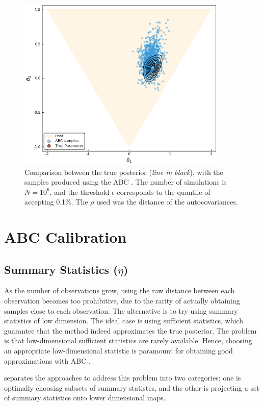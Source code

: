 \documentclass[runningheads]{llncs}
\begin{document}
  \begin{figure}[H]
      \centering
      \includegraphics[width=10cm]{images/ABCmodel1.png}
      \caption{Comparison between the true posterior
      (\textit{line in black}), with the samples produced using the ABC
      . The number of simulations is $N = 10^6$,
      and the threshold $\epsilon$ corresponds to the quantile of
      accepting 0.1\%. The $\rho$ used was the distance
      of the autocovariances.}
  \end{figure}

\section{ABC Calibration}
\subsection{Summary Statistics ($\eta$)}
\label{subsec:statistical-summaries}

As the number of observations
grow, using the raw distance between each observation becomes too
prohibitive, due to the rarity of actually
obtaining samples close to each observation.
The alternative is to try using summary statistics of low dimension.
The ideal case is using sufficient statistics, which guarantee that the
method indeed approximates the true posterior.
The problem is that
low-dimensional sufficient statistics are rarely available. Hence,
choosing an appropriate low-dimensional statistic is paramount for
obtaining good approximations with ABC \citep{Marin2012}.

\citet{Beaumont2018} separates the approaches to address this
problem into two categories: one is optimally choosing
subsets of summary statistcs, and the other is projecting
a set of summary statistics onto lower dimensional maps.
\end{document}

